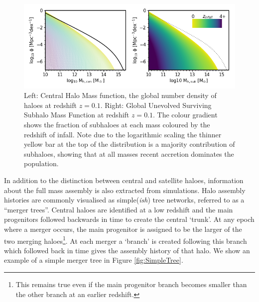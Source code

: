 \begin{figure}[h]
    \centering
    \includegraphics[width = \linewidth]{Figures/Chapter1/SubHaloes_byz.png}
    \caption{Left: Central Halo Mass function, the global number density of haloes at redshift $z=0.1$. Right: Global Unevolved Surviving Subhalo Mass Function at redshift $z=0.1$. The colour gradient shows the fraction of subhaloes at each mass coloured by the redshift of infall. Note due to the logarithmic scaling the thinner yellow bar at the top of the distribution is a majority contribution of subhaloes, showing that at all masses recent accretion dominates the population.}
    \label{fig:SubHaloes_byz}
\end{figure}

In addition to the distinction between central and satellite haloes, information about the full mass assembly is also extracted from simulations. Halo assembly histories are commonly visualised as simple(\textit{ish}) tree networks, referred to as a ``merger trees''. Central haloes are identified at a low redshift and the main progenitors followed backwards in time to create the central `trunk'. At any epoch where a merger occurs, the main progenitor is assigned to be the larger of the two merging haloes\footnote{This remains true even if the main progenitor branch becomes smaller than the other branch at an earlier redshift.}. At each merger a `branch' is created following this branch which followed back in time gives the assembly history of that halo. We show an example of a simple merger tree in Figure \ref{fig:SimpleTree}.

